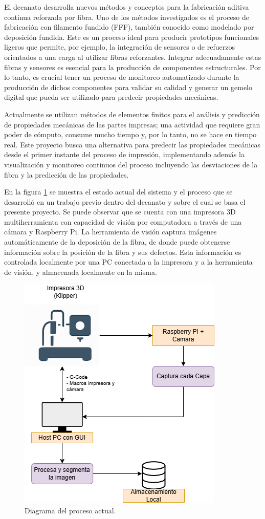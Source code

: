 \documentclass[
11pt, %
]{charter}
\begin{document}
El decanato desarrolla nuevos métodos y conceptos para la fabricación aditiva continua reforzada por fibra. Uno de los métodos investigados es el proceso de fabricación con filamento fundido (FFF), también conocido como modelado por deposición fundida. Este es un proceso ideal para producir prototipos funcionales ligeros que permite, por ejemplo, la integración de sensores o de refuerzos orientados a una carga al utilizar fibras reforzantes. Integrar adecuadamente estas fibras y sensores es esencial para la producción de componentes estructurales. Por lo tanto, es crucial tener un proceso de monitoreo automatizado durante la producción de dichos componentes para validar su calidad y generar un gemelo digital que pueda ser utilizado para predecir propiedades mecánicas.

Actualmente se utilizan métodos de elementos finitos para el análisis y predicción de propiedades mecánicas de las partes impresas; una actividad que requiere gran poder de cómputo, consume mucho tiempo y, por lo tanto, no se hace en tiempo real. Este proyecto busca una alternativa para predecir las propiedades mecánicas desde el primer instante del proceso de impresión, implementando además la visualización y monitoreo continuos del proceso incluyendo las desviaciones de la fibra y la predicción de las propiedades.

En la figura \ref{fig:procesoActual} se muestra el estado actual del sistema y el proceso que se desarrolló en un trabajo previo dentro del decanato y sobre el cual se basa el presente proyecto. Se puede observar que se cuenta con una impresora 3D multiherramienta con capacidad de visión por computadora a través de una cámara y Raspberry Pi. La herramienta de visión captura imágenes automáticamente de la deposición de la fibra, de donde puede obtenerse información sobre la posición de la fibra y sus defectos. Esta información es controlada localmente por una PC conectada a la impresora y a la herramienta de visión, y almacenada localmente en la misma.

\begin{figure}[htpb]
\centering 
\includegraphics[width=.5\textwidth]{Figuras/proceso-Actual.png}
\caption{Diagrama del proceso actual.}
\label{fig:procesoActual}
\end{figure}
\end{document}
